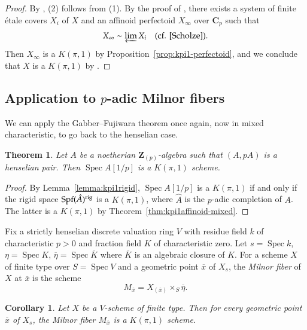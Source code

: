 \documentclass[twoside]{amsart}
\newcommand{\CC}{\mathbf{C}}
\newcommand{\ZZ}{\mathbf{Z}}
\newcommand{\rig}{{\rm rig}}
\DeclareMathOperator{\Spec}{Spec}
\DeclareMathOperator{\Spf}{Spf}
\renewcommand{\bar}{\overline}
\theoremstyle{plain}
\newtheorem{theorem}[subsubsection]{Theorem}
\newtheorem{corollary}[subsubsection]{Corollary}
\theoremstyle{definition}
\theoremstyle{remark}
\numberwithin{equation}{subsection}
\begin{document}
\begin{proof}
By \cite[Proposition~2.1.4]{Huber}, (2) follows from (1). By the proof of \cite[Theorem~4.9]{ScholzePAdic}, there exists a system of finite \'etale covers $X_i$ of $X$ and an affinoid perfectoid $X_\infty$ over $\CC_p$ such that 
\[ 
	X_\infty\sim \varprojlim X_i \quad (\text{cf. \cite[Definition~7.14]{Scholze}}).
\]
Then $X_\infty$ is a $K(\pi, 1)$ by Proposition~\ref{prop:kpi1-perfectoid}, and we conclude that $X$ is a $K(\pi, 1)$ by \cite[Corollary~7.18]{Scholze}.
\end{proof}

\subsection{Application to $p$-adic Milnor fibers}

We can apply the Gabber--Fujiwara theorem once again, now in mixed characteristic, to go back to the henselian case.

\begin{theorem} \label{thm:henselian-mixed}
	Let $A$ be a noetherian $\ZZ_{(p)}$-algebra such that $(A, pA)$ is a henselian pair. Then $\Spec A[1/p]$ is a $K(\pi, 1)$ scheme.
\end{theorem}

\begin{proof}
By Lemma~\ref{lemma:kpi1rigid}, $\Spec A[1/p]$ is a $K(\pi, 1)$ if and only if the rigid space $\Spf(\hat A)^\rig$ is a $K(\pi, 1)$, where $\hat A$ is the $p$-adic completion of $A$. The latter is a $K(\pi, 1)$ by Theorem~\ref{thm:kpi1affinoid-mixed}.
\end{proof}

Fix a strictly henselian discrete valuation ring $V$ with residue field $k$ of characteristic $p>0$ and fraction field $K$ of characteristic zero. Let $s=\Spec k$, $\eta=\Spec K$, $\bar\eta=\Spec\bar K$ where $\bar K$ is an algebraic closure of $K$. For a scheme $X$ of finite type over $S=\Spec V$ and a geometric point $\bar x$ of $X_s$, the \emph{Milnor fiber} of $X$ at $\bar x$ is the scheme
\[ 
	M_{\bar x} = X_{(\bar x)}\times_S \bar\eta.
\]

\begin{corollary} \label{cor:milnor-fiber}
	Let $X$ be a $V$-scheme of finite type. Then for every geometric point $\bar x$ of $X_s$, the Milnor fiber $M_{\bar x}$ is a $K(\pi, 1)$ scheme. 
\end{corollary}
\end{document}
